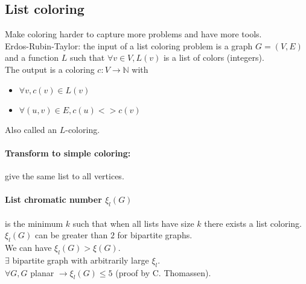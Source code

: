 \documentclass[12pt]{article}
\begin{document}
\subsection{List coloring}
Make coloring harder to capture more problems and have more tools.\\
Erdos-Rubin-Taylor: the input of a list coloring problem is a graph $G=(V,E)$ and a function $L$ such that $\forall v \in V, L(v)$ is a list of colors (integers).\\
The output is a coloring $c : V \rightarrow \mathbb{N}$ with
\begin{itemize}
\item $\forall v, c(v) \in L(v)$
\item $\forall (u, v) \in E, c(u) <> c(v)$
\end{itemize}
Also called an $L$-coloring.\\

\paragraph{Transform to simple coloring:} give the same list to all vertices.\\

\paragraph{List chromatic number $\xi_l(G)$} is the minimum $k$ such that when all lists have size $k$ there exists a list coloring.\\
$\xi_l(G)$ can be greater than $2$ for bipartite graphs.\\
We can have $\xi_l(G) > \xi(G)$.\\
$\exists$ bipartite graph with arbitrarily large $\xi_l$.\\
$\forall G, G$ planar $\rightarrow \xi_l(G) \leqslant 5$ (proof by C. Thomassen).\\
\end{document}

